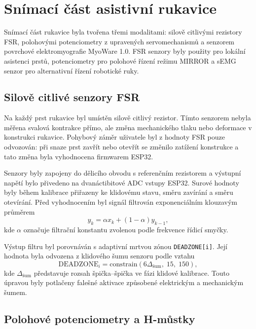 \section{Snímací část asistivní rukavice}
\label{sec:snimaci-cast-rukavice}

Snímací část rukavice byla tvořena třemi modalitami: silově citlivými rezistory FSR, polohovými potenciometry z upravených servomechanismů a senzorem povrchové elektromyografie MyoWare 1.0. FSR senzory byly použity pro lokální asistenci prstů, potenciometry pro polohové řízení režimu MIRROR a sEMG senzor pro alternativní řízení robotické ruky.

\subsection{Silově citlivé senzory FSR}
\label{subsec:fsr}

Na každý prst rukavice byl umístěn silově citlivý rezistor. Tímto senzorem nebyla měřena svalová kontrakce přímo, ale změna mechanického tlaku nebo deformace v konstrukci rukavice. Pohybový záměr uživatele byl z hodnoty FSR pouze odvozován: při snaze prst zavřít nebo otevřít se změnilo zatížení konstrukce a tato změna byla vyhodnocena firmwarem ESP32.

Senzory byly zapojeny do dělicího obvodu s referenčním rezistorem a výstupní napětí bylo přivedeno na dvanáctibitové ADC vstupy ESP32. Surové hodnoty byly během kalibrace přiřazeny ke klidovému stavu, směru zavírání a směru otevírání. Před vyhodnocením byl signál filtrován exponenciálním klouzavým průměrem
\begin{equation}
    y_k = \alpha x_k + \left(1 - \alpha\right)y_{k-1},
\end{equation}
kde $\alpha$ označuje filtrační konstantu zvolenou podle frekvence řídicí smyčky.

Výstup filtru byl porovnáván s adaptivní mrtvou zónou \texttt{DEADZONE[i]}. Její hodnota byla odvozena z klidového šumu senzoru podle vztahu
\begin{equation}
    \mathrm{DEADZONE}_i =
    \mathrm{constrain}\left(6\Delta_{\mathrm{šum}},\;15,\;150\right),
\end{equation}
kde $\Delta_{\mathrm{šum}}$ představuje rozsah špička--špička ve fázi klidové kalibrace. Touto úpravou byly potlačeny falešné aktivace způsobené elektrickým a mechanickým šumem.

\subsection{Polohové potenciometry a H-můstky}
\label{subsec:potenciometry-hmustky}

